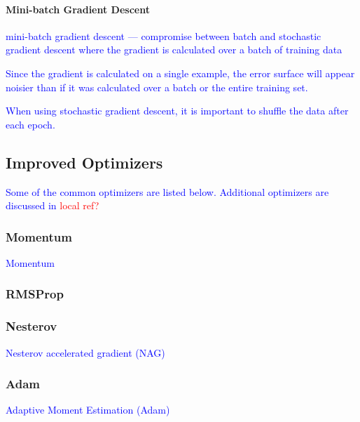 \paragraph{Mini-batch Gradient Descent}

\textcolor{blue}{mini-batch gradient descent --- compromise between batch and stochastic gradient descent where the gradient is calculated over a batch of training data}

\textcolor{blue}{Since the gradient is calculated on a single example, the error surface will appear noisier than if it was calculated over a batch or the entire training set.}

\textcolor{blue}{When using stochastic gradient descent, it is important to shuffle the data after each epoch.}



\subsection{Improved Optimizers}

\textcolor{blue}{Some of the common optimizers are listed below. Additional optimizers are discussed in \textcolor{red}{local ref?}}

\subsubsection{Momentum}

\textcolor{blue}{Momentum~\cite{qian1999momentum}}

\subsubsection{RMSProp}

\subsubsection{Nesterov}

\textcolor{blue}{Nesterov accelerated gradient (NAG)}

\subsubsection{Adam}

\textcolor{blue}{Adaptive Moment Estimation (Adam)~\cite{kingma2014adam}}



